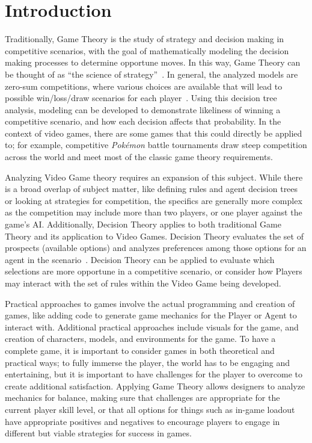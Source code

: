 
\section{Introduction}

Traditionally, Game Theory is the study of strategy and decision making in competitive scenarios, with the goal of mathematically modeling the decision making processes to determine opportune moves. In this way, Game Theory can be thought of as ``the science of strategy''~\cite{b3}. In general, the analyzed models are zero-sum competitions, where various choices are available that will lead to possible win/loss/draw scenarios for each player~\cite{b1}. Using this decision tree analysis, modeling can be developed to demonstrate likeliness of winning a competitive scenario, and how each decision affects that probability. In the context of video games, there are some games that this could directly be applied to; for example, competitive \textit{Pok\'emon} battle tournaments draw steep competition across the world and meet most of the classic game theory requirements.

Analyzing Video Game theory requires an expansion of this subject. While there is a broad overlap of subject matter, like defining rules and agent decision trees or looking at strategies for competition, the specifics are generally more complex as the competition may include more than two players,  or one player against the game's \ac{AI}. Additionally, Decision Theory applies to both traditional Game Theory and its application to Video Games. Decision Theory evaluates the set of prospects (available options) and analyzes preferences among those options for an agent in the scenario~\cite{b2}. Decision Theory can be applied to evaluate which selections are more opportune in a competitive scenario, or consider how Players may interact with the set of rules within the Video Game being developed.

Practical approaches to games involve the actual programming and creation of games, like adding code to generate game mechanics for the Player or Agent to interact with. Additional practical approaches include visuals for the game, and creation of characters, models, and environments for the game. To have a complete game, it is important to consider games in both theoretical and practical ways; to fully immerse the player, the world has to be engaging and entertaining, but it is important to have challenges for the player to overcome to create additional satisfaction. Applying Game Theory allows designers to analyze mechanics for balance, making sure that challenges are appropriate for the current player skill level, or that all options for things such as in-game loadout have appropriate positives and negatives to encourage players to engage in different but viable strategies for success in games.

